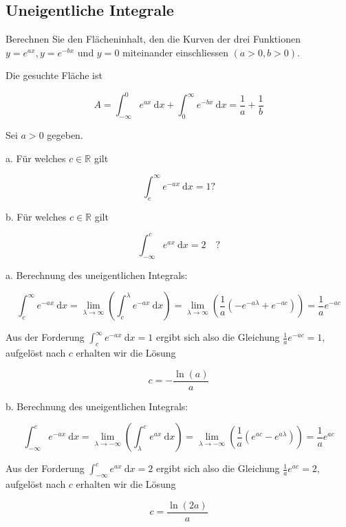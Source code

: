 \subsection*{Uneigentliche Integrale}


\begin{example}
    Berechnen Sie den Flächeninhalt, den die Kurven der drei Funktionen $y=e^{a x}, y=e^{-b x}$ und $y=0$ miteinander einschliessen $(a>0, b>0)$.

    Die gesuchte Fläche ist

$$
A=\int_{-\infty}^{0} e^{a x} \mathrm{~d} x+\int_{0}^{\infty} e^{-b x} \mathrm{~d} x=\frac{1}{a}+\frac{1}{b}
$$

\end{example}

\begin{example}
    Sei $a>0$ gegeben.

a. Für welches $c \in \mathbb{R}$ gilt

$$
\int_{c}^{\infty} e^{-a x} \mathrm{~d} x=1 ?
$$

b. Für welches $c \in \mathbb{R}$ gilt

$$
\int_{-\infty}^{c} e^{a x} \mathrm{~d} x=2 \quad ?
$$

\tcblower

a. Berechnung des uneigentlichen Integrals:

$$
\int_{c}^{\infty} e^{-a x} \mathrm{~d} x=\lim _{\lambda \rightarrow \infty}\left(\int_{c}^{\lambda} e^{-a x} \mathrm{~d} x\right)=\lim _{\lambda \rightarrow \infty}\left(\frac{1}{a}\left(-e^{-a \lambda}+e^{-a c}\right)\right)=\frac{1}{a} e^{-a c}
$$

Aus der Forderung $\int_{c}^{\infty} e^{-a x} \mathrm{~d} x=1$ ergibt sich also die Gleichung $\frac{1}{a} e^{-a c}=1$, aufgelöst nach $c$ erhalten wir die Lösung

$$
c=-\frac{\ln (a)}{a}
$$

b. Berechnung des uneigentlichen Integrals:

$$
\int_{-\infty}^{c} e^{-a x} \mathrm{~d} x=\lim _{\lambda \rightarrow-\infty}\left(\int_{\lambda}^{c} e^{a x} \mathrm{~d} x\right)=\lim _{\lambda \rightarrow-\infty}\left(\frac{1}{a}\left(e^{a c}-e^{a \lambda}\right)\right)=\frac{1}{a} e^{a c}
$$

Aus der Forderung $\int_{-\infty}^{c} e^{a x} \mathrm{~d} x=2$ ergibt sich also die Gleichung $\frac{1}{a} e^{a c}=2$, aufgelöst nach $c$ erhalten wir die Lösung

$$
c=\frac{\ln (2 a)}{a}
$$
\end{example}

